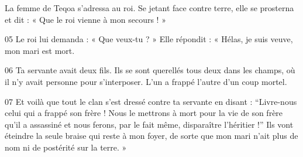 La femme de Teqoa s’adressa au roi. Se jetant face contre terre, elle se prosterna et dit : « Que le roi vienne à mon secours ! »

05 Le roi lui demanda : « Que veux-tu ? » Elle répondit : « Hélas, je suis veuve, mon mari est mort.

06 Ta servante avait deux fils. Ils se sont querellés tous deux dans les champs, où il n’y avait personne pour s’interposer. L’un a frappé l’autre d’un coup mortel.

07 Et voilà que tout le clan s’est dressé contre ta servante en disant : “Livre-nous celui qui a frappé son frère ! Nous le mettrons à mort pour la vie de son frère qu’il a assassiné et nous ferons, par le fait même, disparaître l’héritier !” Ils vont éteindre la seule braise qui reste à mon foyer, de sorte que mon mari n’ait plus de nom ni de postérité sur la terre. »
